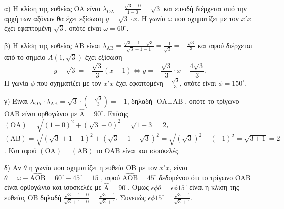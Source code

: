 α) Η κλίση της ευθείας OA είναι $\lambda_{\text{OA}} = \frac{\sqrt{3}-0}{1-0} = \sqrt{3}$ και επειδή διέρχεται από την αρχή των αξόνων θα έχει εξίσωση $y=\sqrt{3} \cdot x$. Η γωνία $\omega$ που σχηματίζει με τον $x'x$ έχει εφαπτομένη $\sqrt{3}$, οπότε είναι $\omega=60^\circ$.

β) Η κλίση της ευθείας AB είναι $\lambda_{\text{AB}} = \frac{\sqrt{3}-1-\sqrt{3}}{\sqrt{3}+1-1} = \frac{-1}{\sqrt{3}} = -\frac{\sqrt{3}}{3}$ και αφού διέρχεται από το σημείο $A(1, \sqrt{3})$ έχει εξίσωση
\[ y-\sqrt{3} = -\frac{\sqrt{3}}{3}(x-1) \Leftrightarrow y = -\frac{\sqrt{3}}{3} \cdot x + \frac{4\sqrt{3}}{3}. \]
Η γωνία $\phi$ που σχηματίζει με τον $x'x$ έχει εφαπτομένη $-\frac{\sqrt{3}}{3}$, οπότε είναι $\phi=150^\circ$.

γ) Είναι $\lambda_{\text{OA}} \cdot \lambda_{\text{AB}} = \sqrt{3} \cdot \left(-\frac{\sqrt{3}}{3}\right) = -1$, δηλαδή $\text{OA} \perp \text{AB}$, οπότε το τρίγωνο OAB είναι ορθογώνιο με $\hat{\text{A}} = 90^\circ$.
Επίσης $(\text{OA}) = \sqrt{(1-0)^2 + (\sqrt{3}-0)^2} = \sqrt{1+3} = 2$, $(\text{AB}) = \sqrt{(\sqrt{3}+1-1)^2 + (\sqrt{3}-1-\sqrt{3})^2} = \sqrt{(\sqrt{3})^2 + (-1)^2} = \sqrt{3+1} = 2$.
Και αφού $(\text{OA})=(\text{AB})$ το OAB είναι και ισοσκελές.

δ) Αν $\theta$ η γωνία που σχηματίζει η ευθεία OB με τον $x'x$, είναι $\theta = \omega - \widehat{\text{AOB}} = 60^\circ - 45^\circ = 15^\circ$, αφού $\widehat{\text{AOB}} = 45^\circ$ δεδομένου ότι το τρίγωνο OAB είναι ορθογώνιο και ισοσκελές με $\hat{\text{A}} = 90^\circ$. Όμως $\epsilon\phi\theta = \epsilon\phi 15^\circ$ είναι η κλίση της ευθείας OB δηλαδή $\frac{\sqrt{3}-1-0}{\sqrt{3}+1-0} = \frac{\sqrt{3}-1}{\sqrt{3}+1}$. Συνεπώς $\epsilon\phi 15^\circ = \frac{\sqrt{3}-1}{\sqrt{3}+1}$.

